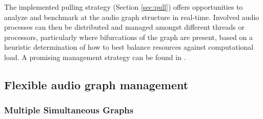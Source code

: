 \documentclass[twoside,a4paper]{article}
\begin{document}
The implemented pulling strategy (Section \ref{sec:pull}) offers opportunities to analyze and benchmark at the audio graph structure in real-time.  Involved audio processes can then be distributed and managed amongst different threads or processors, particularly where bifurcations of the graph are present, based on a heuristic determination of how to best balance resources against computational load.  A promising management strategy can be found in \cite{PartzschAES122}.





%   



\subsection{Flexible audio graph management} %

\subsubsection{Multiple Simultaneous Graphs} %
\end{document}
